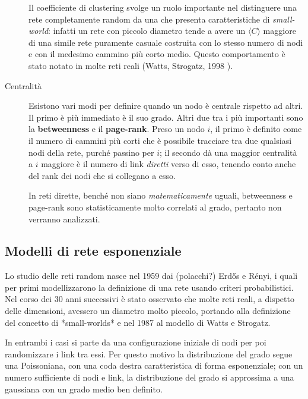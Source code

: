 \begin{description}
	Il coefficiente di clustering svolge un ruolo importante nel distinguere una rete completamente random da una che presenta caratteristiche di \emph{small-world}: infatti un rete con piccolo diametro tende a avere un $\langle C\rangle$ maggiore di una simile rete puramente casuale costruita con lo stesso numero di nodi e con il medesimo cammino più corto medio. Questo comportamento è stato notato in molte reti reali (Watts, Strogatz, 1998
).
	\item[Centralit\`a] Esistono vari modi per definire quando un nodo è centrale rispetto ad altri. Il primo è più immediato è il suo grado. Altri due tra i più importanti sono la \textbf{betweenness} e il \textbf{page-rank}. Preso un nodo $i$, il primo è definito come il numero di cammini più corti che è possibile tracciare tra due qualsiasi nodi della rete, purché passino per $i$; il secondo dà una maggior centralità a $i$ maggiore è il numero di link \emph{diretti} verso di esso, tenendo conto anche del rank dei nodi che si collegano a esso. 
	
	In reti dirette, benché non siano \emph{matematicamente} uguali, betweenness e page-rank sono statisticamente molto correlati al grado, pertanto non verranno analizzati. 
\end{description}

\subsection{Modelli di rete esponenziale }
Lo studio delle reti random nasce nel 1959 dai (polacchi?) Erdős e Rényi, i quali per primi modellizzarono la definizione di una rete usando criteri probabilistici. Nel corso dei 30 anni successivi è stato osservato che molte reti reali, a dispetto delle dimensioni, avessero un diametro molto piccolo, portando alla definizione del concetto di *small-worlds* e nel 1987 al modello di Watts e Strogatz.

In entrambi i casi si parte da una configurazione iniziale di nodi per poi randomizzare i link tra essi. Per questo motivo la distribuzione del grado segue una Poissoniana, con una coda destra caratteristica di forma esponenziale; con un numero sufficiente di nodi e link, la distribuzione del grado si approssima a una gaussiana con un grado medio ben definito.

